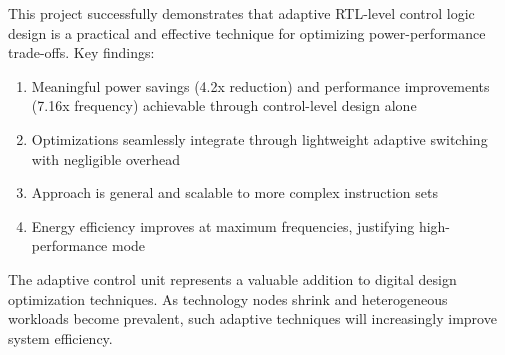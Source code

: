 \documentclass[15pt,a4paper]{report}
\begin{document}
This project successfully demonstrates that adaptive RTL-level control logic design is a practical and effective technique for optimizing power-performance trade-offs. Key findings:

\begin{enumerate}
    \item Meaningful power savings (4.2x reduction) and performance improvements (7.16x frequency) achievable through control-level design alone
    
    \item Optimizations seamlessly integrate through lightweight adaptive switching with negligible overhead
    
    \item Approach is general and scalable to more complex instruction sets
    
    \item Energy efficiency improves at maximum frequencies, justifying high-performance mode
\end{enumerate}

The adaptive control unit represents a valuable addition to digital design optimization techniques. As technology nodes shrink and heterogeneous workloads become prevalent, such adaptive techniques will increasingly improve system efficiency.

\newpage
\end{document}
